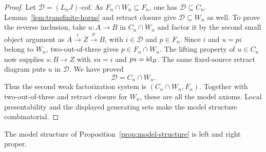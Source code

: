 \begin{proof}
Let $\mathcal D=(L_nJ)\text{-cof}$.  As $F_n\cap W_n\subseteq F_n$,
one has $\mathcal D\subseteq C_n$.  Lemma~\ref{lem:transfinite-horns} and
retract closure give $\mathcal D\subseteq W_n$ as well.  To prove the
reverse inclusion, take $u:A\to B$ in $C_n\cap W_n$ and factor it
by the second small object argument as
$A\xrightarrow{i}Z\xrightarrow{p}B$, with $i\in\mathcal D$ and
$p\in F_n$.  Since $i$ and $u=pi$ belong to $W_n$,
two-out-of-three gives $p\in F_n\cap W_n$.  The lifting property
of $u\in C_n$ now supplies $s:B\to Z$ with $su=i$ and
$ps=\mathrm{id}_B$.  The same fixed-source retract diagram puts $u$ in
$\mathcal D$.  We have proved
\[
 \mathcal D=C_n\cap W_n.
\]
Thus the second weak factorization system is $(C_n\cap W_n,F_n)$.
Together with two-out-of-three and retract closure for $W_n$, these
are all the model axioms.  Local presentability and the displayed
generating sets make the model structure combinatorial.
\end{proof}

\begin{proposition}[Properness]\label{prop:properness}
The model structure of Proposition~\ref{prop:model-structure} is
left and right proper.
\end{proposition}

